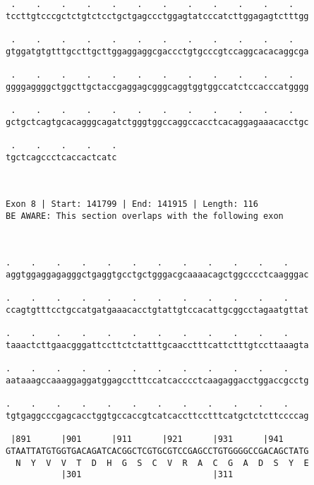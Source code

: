 \documentclass{article}
\begin{document}
\begin{Verbatim}
 .    .    .    .    .    .    .    .    .    .    .    .   
tccttgtcccgctctgtctcctgctgagccctggagtatcccatcttggagagtctttgg
                                                            
 .    .    .    .    .    .    .    .    .    .    .    .   
gtggatgtgtttgccttgcttggaggaggcgaccctgtgcccgtccaggcacacaggcga
                                                            
 .    .    .    .    .    .    .    .    .    .    .    .   
ggggaggggctggcttgctaccgaggagcgggcaggtggtggccatctccacccatgggg
                                                            
 .    .    .    .    .    .    .    .    .    .    .    .   
gctgctcagtgcacagggcagatctgggtggccaggccacctcacaggagaaacacctgc
                                                            
 .    .    .    .    .
tgctcagccctcaccactcatc
                      
                      
 
Exon 8 | Start: 141799 | End: 141915 | Length: 116
BE AWARE: This section overlaps with the following exon



.    .    .    .    .    .    .    .    .    .    .    .    
aggtggaggagagggctgaggtgcctgctgggacgcaaaacagctggcccctcaagggac
                                                            
.    .    .    .    .    .    .    .    .    .    .    .    
ccagtgtttcctgccatgatgaaacacctgtattgtccacattgcggcctagaatgttat
                                                            
.    .    .    .    .    .    .    .    .    .    .    .    
taaactcttgaacgggattccttctctatttgcaacctttcattctttgtccttaaagta
                                                            
.    .    .    .    .    .    .    .    .    .    .    .    
aataaagccaaaggaggatggagcctttccatcacccctcaagaggacctggaccgcctg
                                                            
.    .    .    .    .    .    .    .    .    .    .    .    
tgtgaggcccgagcacctggtgccaccgtcatcaccttcctttcatgctctcttccccag
                                                            
 |891      |901      |911      |921      |931      |941     
GTAATTATGTGGTGACAGATCACGGCTCGTGCGTCCGAGCCTGTGGGGCCGACAGCTATG
  N  Y  V  V  T  D  H  G  S  C  V  R  A  C  G  A  D  S  Y  E
           |301                          |311               
  

\end{Verbatim}
\end{document}
